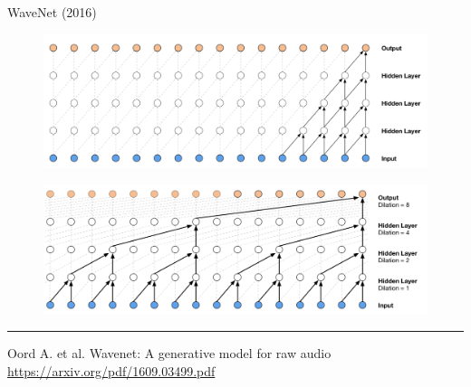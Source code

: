 \documentclass{beamer}
\begin{document}
\begin{frame}{WaveNet (2016)}
\begin{figure}
    \centering
    \includegraphics[width=0.9\linewidth]{figs/wavenet1.png}
\end{figure}

\begin{figure}
    \centering
    \includegraphics[width=0.9\linewidth]{figs/wavenet2.png}
\end{figure}
\vfill
\hrule\medskip
{\scriptsize Oord A. et al. Wavenet: A generative model for raw audio \href{https://arxiv.org/pdf/1609.03499.pdf}{https://arxiv.org/pdf/1609.03499.pdf}}
\end{frame}
\end{document}
